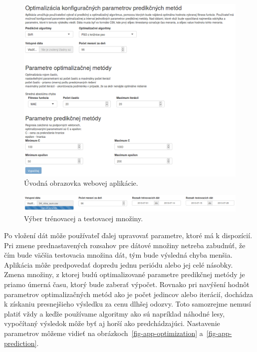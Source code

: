 \documentclass[a4paper,slovak,12pt,appendix]{article}
\begin{document}
\begin{appendices}
\begin{figure}[H]
  \centering
  \includegraphics[width=\textwidth]{app_welcome.png}
  \caption{Úvodná obrazovka webovej aplikácie.}
  \label{fig-app-screen}
\end{figure}

\begin{figure}[H]
  \centering
  \includegraphics[width=\textwidth]{app_data.png}
  \caption{Výber trénovacej a testovacej množiny.}
  \label{fig-app-data}
\end{figure}

Po vložení dát môže používateľ ďalej upravovať parametre, ktoré má k dispozícií.
Pri zmene prednastavených rozsahov pre dátové množiny netreba zabudnúť, že čím
bude väčšia testovacia množina dát, tým bude výsledná chyba menšia. Aplikácia
môže predpovedať dopredu jednu periódu alebo jej celé násobky. Zmena množiny,
z ktorej budú optimalizované parametre predikčnej metódy je priamo úmerná
času, ktorý bude zaberať výpočet. Rovnako pri navýšení hodnôt parametrov
optimalizačných metód ako je počet jedincov alebo iterácií, dochádza k získaniu
presnejšieho výsledku za cenu dlhšej odozvy. Toto samozrejme nemusí platiť vždy
a keďže používame algoritmy ako sú napríklad náhodné lesy, vypočítaný výsledok môže
byť aj horší ako predchádzajúci. Nastavenie parametrov môžeme vidieť na
obrázkoch~\ref{fig-app-optimization} a~\ref{fig-app-prediction}.


\end{appendices}
\end{document}
